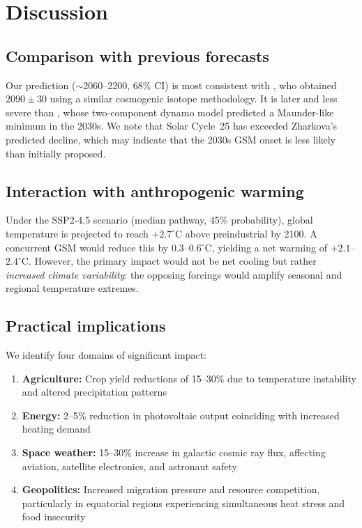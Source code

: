 \documentclass[twocolumn,preprintnumbers,amsmath,amssymb]{revtex4-2}
\begin{document}
\section{Discussion}
\label{sec:discussion}

\subsection{Comparison with previous forecasts}

Our prediction ($\sim$2060--2200, 68\% CI) is most consistent with \citet{Steinhilber2013}, who obtained $2090 \pm 30$ using a similar cosmogenic isotope methodology. It is later and less severe than \citet{Zharkova2015}, whose two-component dynamo model predicted a Maunder-like minimum in the 2030s. We note that Solar Cycle~25 has exceeded Zharkova's predicted decline, which may indicate that the 2030s GSM onset is less likely than initially proposed.

\subsection{Interaction with anthropogenic warming}

Under the SSP2-4.5 scenario (median pathway, 45\% probability), global temperature is projected to reach $+2.7^\circ$C above preindustrial by 2100. A concurrent GSM would reduce this by $0.3$--$0.6^\circ$C, yielding a net warming of $+2.1$--$2.4^\circ$C. However, the primary impact would not be net cooling but rather \textit{increased climate variability}: the opposing forcings would amplify seasonal and regional temperature extremes.

\subsection{Practical implications}

We identify four domains of significant impact:
\begin{enumerate}
    \item \textbf{Agriculture:} Crop yield reductions of 15--30\% due to temperature instability and altered precipitation patterns
    \item \textbf{Energy:} 2--5\% reduction in photovoltaic output coinciding with increased heating demand
    \item \textbf{Space weather:} 15--30\% increase in galactic cosmic ray flux, affecting aviation, satellite electronics, and astronaut safety
    \item \textbf{Geopolitics:} Increased migration pressure and resource competition, particularly in equatorial regions experiencing simultaneous heat stress and food insecurity
\end{enumerate}
\end{document}
